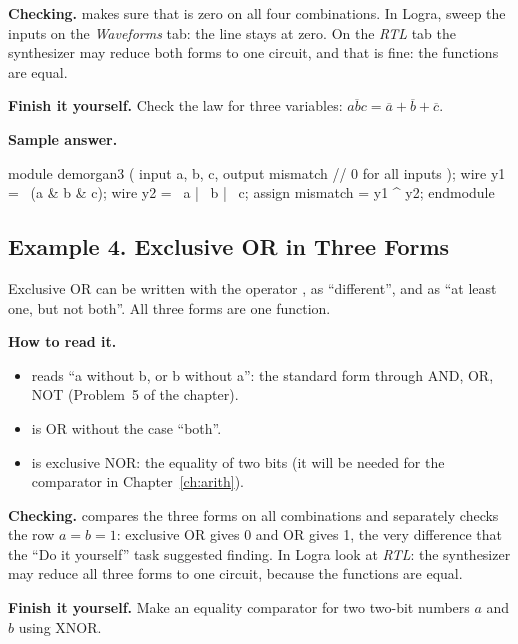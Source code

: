 \textbf{Checking.}  makes sure that  is zero
on all four combinations. In Logra, sweep the inputs on the \emph{Waveforms}
tab: the  line stays at zero. On the \emph{RTL} tab the
synthesizer may reduce both forms to one circuit, and that is fine: the
functions are equal.

\textbf{Finish it yourself.} Check the law for three variables:
$\overline{abc}=\overline a+\overline b+\overline c$.

\textbf{Sample answer.}\par\nopagebreak
\begin{vcode}
module demorgan3 (
    input  a, b, c,
    output mismatch      // 0 for all inputs
);
    wire y1 = ~(a & b & c);
    wire y2 = ~a | ~b | ~c;
    assign mismatch = y1 ^ y2;
endmodule
\end{vcode}

\subsection{Example 4. Exclusive OR in Three Forms}

Exclusive OR can be written with the operator \code{\^{}}, as ``different'', and
as ``at least one, but not both''. All three forms are one function.


\textbf{How to read it.}
\begin{itemize}
  \item {} reads ``a without b, or b without a'': the standard form through AND, OR, NOT (Problem~5 of the chapter).
  \item {} is OR without the case ``both''.
  \item {} is exclusive NOR: the equality of two bits (it will be needed for the comparator in Chapter~\ref{ch:arith}).
\end{itemize}
\textbf{Checking.}  compares the three forms on all
combinations and separately checks the row $a=b=1$: exclusive OR gives 0 and OR
gives 1, the very difference that the ``Do it yourself'' task suggested finding.
In Logra look at \emph{RTL}: the synthesizer may reduce all three forms to one
circuit, because the functions are equal.

\textbf{Finish it yourself.} Make an equality comparator for two two-bit
numbers $a$ and $b$ using XNOR.

